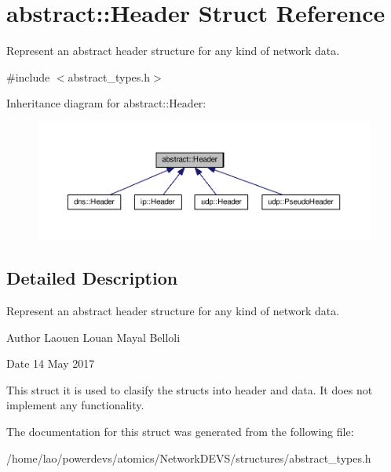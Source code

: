 \hypertarget{structabstract_1_1Header}{}\section{abstract\+:\+:Header Struct Reference}
\label{structabstract_1_1Header}


Represent an abstract header structure for any kind of network data.  




{\ttfamily \#include $<$abstract\+\_\+types.\+h$>$}



Inheritance diagram for abstract\+:\+:Header\+:
\nopagebreak
\begin{figure}[H]
\begin{center}
\leavevmode
\includegraphics[width=350pt]{structabstract_1_1Header__inherit__graph}
\end{center}
\end{figure}


\subsection{Detailed Description}
Represent an abstract header structure for any kind of network data. 

\begin{DoxyAuthor}{Author}
Laouen Louan Mayal Belloli 
\end{DoxyAuthor}
\begin{DoxyDate}{Date}
14 May 2017
\end{DoxyDate}
This struct it is used to clasify the structs into header and data. It does not implement any functionality. 

The documentation for this struct was generated from the following file\+:\begin{DoxyCompactItemize}
\item 
/home/lao/powerdevs/atomics/\+Network\+D\+E\+V\+S/structures/abstract\+\_\+types.\+h\end{DoxyCompactItemize}
